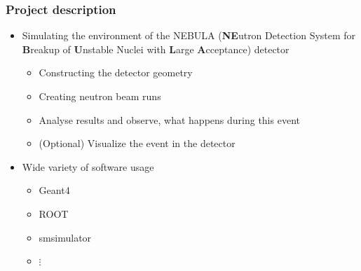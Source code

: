 \begin{frame}
\frametitle{Project description}

\begin{itemize}
	\item Simulating the environment of the NEBULA (\textbf{NE}utron Detection System for \textbf{B}reakup of \textbf{U}nstable Nuclei with \textbf{L}arge \textbf{A}cceptance) detector
	\begin{itemize}
		\item Constructing the detector geometry
		\item Creating neutron beam runs
		\item Analyse results and observe, what happens during this event
		\item (Optional) Visualize the event in the detector
	\end{itemize}
	\item Wide variety of software usage
	\begin{itemize}
		\item Geant4
		\item ROOT
		\item smsimulator
		\item[] $\vdots$
	\end{itemize}
\end{itemize}

\end{frame}